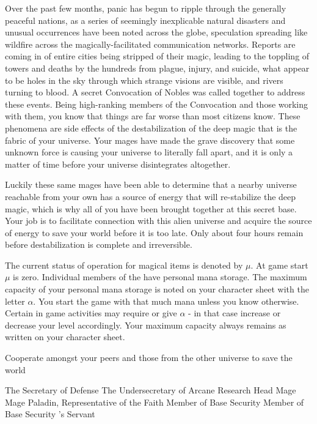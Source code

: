 \documentclass[blue]{guildcamp3}
\begin{document}
Over the past few months, panic has begun to ripple through the generally peaceful nations, as a series of seemingly inexplicable natural disasters and unusual occurrences have been noted across the globe, speculation spreading like wildfire across the magically-facilitated communication networks. Reports are coming in of entire cities being stripped of their magic, leading to the toppling of towers and deaths by the hundreds from plague, injury, and suicide, what appear to be holes in the sky through which strange visions are visible, and rivers turning to blood. A secret Convocation of Nobles was called together to address these events. Being high-ranking members of the Convocation and those working with them, you know that things are far worse than most citizens know. These phenomena are side effects of the destabilization of the deep magic that is the fabric of your universe. Your mages have made the grave discovery that some unknown force is causing your universe to literally fall apart, and it is only a matter of time before your universe disintegrates altogether.

Luckily these same mages have been able to determine that a nearby universe reachable from your own has a source of energy that will re-stabilize the deep magic, which is why all of you have been brought together at this secret base. Your job is to facilitate connection with this alien universe and acquire the source of energy to save your world before it is too late. Only about four hours remain before destabilization is complete and irreversible.

The current status of operation for magical items is denoted by $\mu$. At game start $\mu$ is zero. Individual members of the \bMagicWorld{} have personal mana storage. The maximum capacity of your personal mana storage is noted on your character sheet with the letter $\alpha$. You start the game with that much mana unless you know otherwise. Certain in game activities may require or give $\alpha$ - in that case increase or decrease your level accordingly. Your maximum capacity always remains as written on your character sheet. 

\begin{itemz}[Goals]
	\item Cooperate amongst your peers and those from the other universe to save the world
\end{itemz}


\begin{members}
	\member{\cNobleOne{}} The Secretary of Defense
	\member{\cNobleTwo{}} The Undersecretary of Arcane Research
	\member{\cMageOne{}} Head Mage
	\member{\cMageTwo{}} Mage
	\member{\cPaladin{}} Paladin, Representative of the Faith
	\member{\cRogueOne{}} Member of Base Security
	\member{\cRogueTwo{}} Member of Base Security
	\member{\cServant{}} \cNobleOne{}'s Servant
\end{members}
\end{document}
